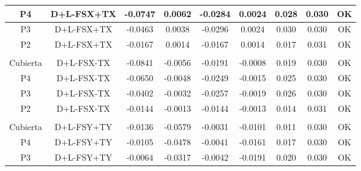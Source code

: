 \begin{table}[H]
{\begin{tabular}{|c|c|c|c|c|c|c|c|c|}
    \hline
    P4  & D+L-FSX+TX & -0.0747 & 0.0062 & -0.0284 & 0.0024 & 0.028 & 0.030 & \cellcolor[rgb]{ .776,  .937,  .808}\textcolor[rgb]{ 0,  .38,  0}{OK} \bigstrut\\
    \hline
    P3  & D+L-FSX+TX & -0.0463 & 0.0038 & -0.0296 & 0.0024 & 0.030 & 0.030 & \cellcolor[rgb]{ .776,  .937,  .808}\textcolor[rgb]{ 0,  .38,  0}{OK} \bigstrut\\
    \hline
    P2  & D+L-FSX+TX & -0.0167 & 0.0014 & -0.0167 & 0.0014 & 0.017 & 0.031 & \cellcolor[rgb]{ .776,  .937,  .808}\textcolor[rgb]{ 0,  .38,  0}{OK} \bigstrut\\
    \hline
    \multicolumn{1}{|r}{} & \multicolumn{1}{r}{} & \multicolumn{1}{r}{} & \multicolumn{1}{r}{} & \multicolumn{1}{r}{} & \multicolumn{1}{r}{} & \multicolumn{1}{r}{} & \multicolumn{1}{r}{} &  \bigstrut\\
    \hline
    Cubierta & D+L-FSX-TX & -0.0841 & -0.0056 & -0.0191 & -0.0008 & 0.019 & 0.030 & \cellcolor[rgb]{ .776,  .937,  .808}\textcolor[rgb]{ 0,  .38,  0}{OK} \bigstrut\\
    \hline
    P4  & D+L-FSX-TX & -0.0650 & -0.0048 & -0.0249 & -0.0015 & 0.025 & 0.030 & \cellcolor[rgb]{ .776,  .937,  .808}\textcolor[rgb]{ 0,  .38,  0}{OK} \bigstrut\\
    \hline
    P3  & D+L-FSX-TX & -0.0402 & -0.0032 & -0.0257 & -0.0019 & 0.026 & 0.030 & \cellcolor[rgb]{ .776,  .937,  .808}\textcolor[rgb]{ 0,  .38,  0}{OK} \bigstrut\\
    \hline
    P2  & D+L-FSX-TX & -0.0144 & -0.0013 & -0.0144 & -0.0013 & 0.014 & 0.031 & \cellcolor[rgb]{ .776,  .937,  .808}\textcolor[rgb]{ 0,  .38,  0}{OK} \bigstrut\\
    \hline
    \multicolumn{1}{|r}{} & \multicolumn{1}{r}{} & \multicolumn{1}{r}{} & \multicolumn{1}{r}{} & \multicolumn{1}{r}{} & \multicolumn{1}{r}{} & \multicolumn{1}{r}{} & \multicolumn{1}{r}{} &  \bigstrut\\
    \hline
    Cubierta & D+L-FSY+TY & -0.0136 & -0.0579 & -0.0031 & -0.0101 & 0.011 & 0.030 & \cellcolor[rgb]{ .776,  .937,  .808}\textcolor[rgb]{ 0,  .38,  0}{OK} \bigstrut\\
    \hline
    P4  & D+L-FSY+TY & -0.0105 & -0.0478 & -0.0041 & -0.0161 & 0.017 & 0.030 & \cellcolor[rgb]{ .776,  .937,  .808}\textcolor[rgb]{ 0,  .38,  0}{OK} \bigstrut\\
    \hline
    P3  & D+L-FSY+TY & -0.0064 & -0.0317 & -0.0042 & -0.0191 & 0.020 & 0.030 & \cellcolor[rgb]{ .776,  .937,  .808}\textcolor[rgb]{ 0,  .38,  0}{OK} \bigstrut\\

\end{tabular}}
\end{table}
